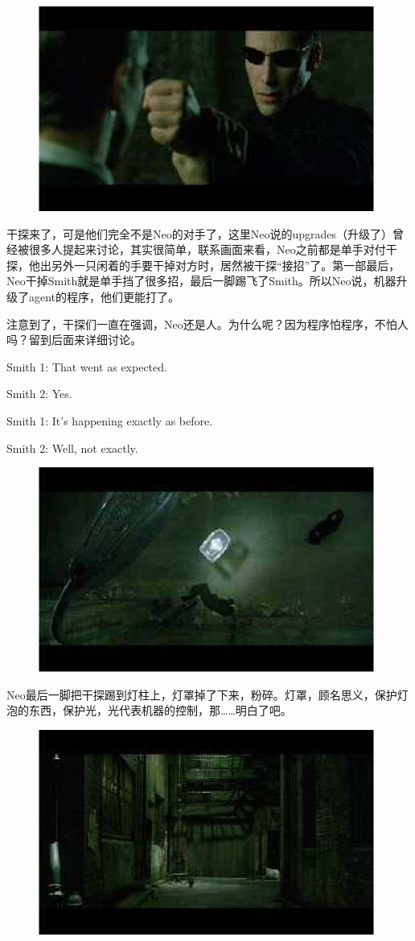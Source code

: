 \documentclass[UTF8]{ctexart}
\newenvironment{myquote}{\color{green} \setlength{\leftskip}{6em} \setlength{\rightskip}{4em} \setlength{\parindent}{-2em}}{\par}
\begin{document}
\begin{figure}[htb]
\centering
\includegraphics[width=0.5\linewidth]{fig/read_reloaded-22}
\end{figure}

干探来了，可是他们完全不是Neo的对手了，这里Neo说的upgrades（升级了）曾经被很多人提起来讨论，其实很简单，联系画面来看，Neo之前都是单手对付干探，他出另外一只闲着的手要干掉对方时，居然被干探“接招”了。第一部最后，Neo干掉Smith就是单手挡了很多招，最后一脚踢飞了Smith。所以Neo说，机器升级了agent的程序，他们更能打了。

注意到了，干探们一直在强调，Neo还是人。为什么呢？因为程序怕程序，不怕人吗？留到后面来详细讨论。

\begin{myquote}
Smith 1: That went as expected.

Smith 2: Yes.

Smith 1: It's happening exactly as before.

Smith 2: Well, not exactly.
\end{myquote}

\begin{figure}[htb]
\centering
\includegraphics[width=0.5\linewidth]{fig/read_reloaded-23}
\end{figure}

Neo最后一脚把干探踢到灯柱上，灯罩掉了下来，粉碎。灯罩，顾名思义，保护灯泡的东西，保护光，光代表机器的控制，那……明白了吧。

\begin{figure}[htb]
\centering
\includegraphics[width=0.5\linewidth]{fig/read_reloaded-24}
\end{figure}
\end{document}
